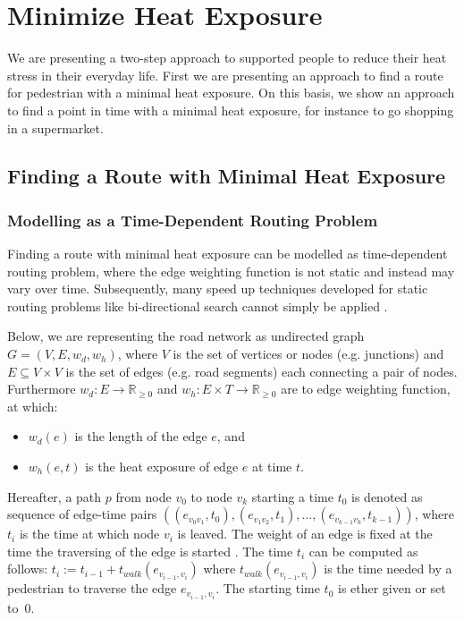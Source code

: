 
\section{Minimize Heat Exposure}

We are presenting a two-step approach to supported people to reduce their heat stress in their everyday life. First we are presenting an approach to find a route for pedestrian with a minimal heat exposure. On this basis, we show an approach to find a point in time with a minimal heat exposure, for instance to go shopping in a supermarket.

\subsection{Finding a Route with Minimal Heat Exposure \label{sec:optimal-route}}

\subsubsection{Modelling as a Time-Dependent Routing Problem}

Finding a route with minimal heat exposure can be modelled as time-dependent routing problem, where the edge weighting function is not static and instead may vary over time. Subsequently, many speed up techniques developed for static routing problems like bi-directional search cannot simply be applied \parencite{Delling2009}. 

Below, we are representing the road network as undirected graph $G=(V,E,w_d,w_h)$, where $V$ is the set of vertices or nodes (e.g. junctions) and $E\subseteq V\times V$ is the set of edges (e.g. road segments) each connecting a pair of nodes. Furthermore $w_d: E \to \mathbb{R}_{\geq 0}$ and $w_h: E \times T \to \mathbb{R}_{\geq 0}$ are to edge weighting function, at which:
\begin{itemize}
	\item $w_d(e)$ is the length of the edge $e$, and
	\item $w_h(e, t)$ is the heat exposure of edge $e$ at time $t$.
\end{itemize}   
Hereafter, a path $p$ from node $v_0$ to node $v_k$ starting a time $t_0$ is denoted as sequence of edge-time pairs $((e_{v_0v_1},t_0),(e_{v_1v_2},t_1),\dots, (e_{v_{k-1}v_k},t_{k-1}))$, where $t_i$ is the time at which node $v_i$ is leaved. The weight of an edge is fixed at the time the traversing of the edge is started \parencite[the so-called frozen link model,][]{Orda1990}. The time $t_i$ can be computed as follows: $t_i := t_{i-1} + t_{walk}(e_{v_{i-1},v_i})$ where $t_{walk}(e_{v_{i-1},v_i})$ is the time needed by a pedestrian to traverse the edge $e_{v_{i-1},v_i}$. The starting time $t_0$ is ether given or set to~$0$. 

